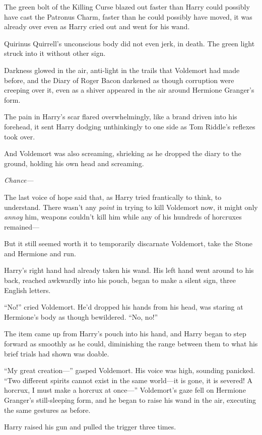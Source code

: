 The green bolt of the Killing Curse blazed out faster than Harry could possibly have cast the Patronus Charm, faster than he could possibly have moved, it was already over even as Harry cried out and went for his wand.

Quirinus Quirrell’s unconscious body did not even jerk, in death. The green light struck into it without other sign.

Darkness glowed in the air, anti-light in the trails that Voldemort had made before, and the Diary of Roger Bacon darkened as though corruption were creeping over it, even as a shiver appeared in the air around Hermione Granger’s form.

The pain in Harry’s scar flared overwhelmingly, like a brand driven into his forehead, it sent Harry dodging unthinkingly to one side as Tom Riddle’s reflexes took over.

And Voldemort was also screaming, shrieking as he dropped the diary to the ground, holding his own head and screaming.

\emph{Chance—}

The last voice of hope said that, as Harry tried frantically to think, to understand. There wasn’t any \emph{point} in trying to kill Voldemort now, it might only \emph{annoy} him, weapons couldn’t kill him while any of his hundreds of horcruxes remained—

But it still seemed worth it to temporarily discarnate Voldemort, take the Stone and Hermione and run.

Harry’s right hand had already taken his wand. His left hand went around to his back, reached awkwardly into his pouch, began to make a silent sign, three English letters.

“No!” cried Voldemort. He’d dropped his hands from his head, was staring at Hermione’s body as though bewildered. “No, no!”

The item came up from Harry’s pouch into his hand, and Harry began to step forward as smoothly as he could, diminishing the range between them to what his brief trials had shown was doable.

“My great creation—” gasped Voldemort. His voice was high, sounding panicked. “Two different spirits cannot exist in the same world—it is gone, it is severed! A horcrux, I must make a horcrux at once—” Voldemort’s gaze fell on Hermione Granger’s still-sleeping form, and he began to raise his wand in the air, executing the same gestures as before.

Harry raised his gun and pulled the trigger three times.

